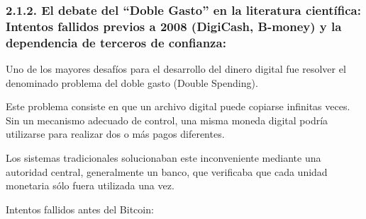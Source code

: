 \documentclass[12pt,a4paper]{article}
\begin{document}
\subsubsection*{2.1.2. El debate del ``Doble Gasto'' en la literatura científica: Intentos fallidos previos a 2008 (DigiCash, B-money) y la dependencia de terceros de confianza:}

Uno de los mayores desafíos para el desarrollo del dinero digital fue resolver el denominado
problema del doble gasto (Double Spending).

Este problema consiste en que un archivo digital puede copiarse infinitas veces. Sin un
mecanismo adecuado de control, una misma moneda digital podría utilizarse para realizar
dos o más pagos diferentes.

Los sistemas tradicionales solucionaban este inconveniente mediante una autoridad central,
generalmente un banco, que verificaba que cada unidad monetaria sólo fuera utilizada una
vez.

Intentos fallidos antes del Bitcoin:
\end{document}
